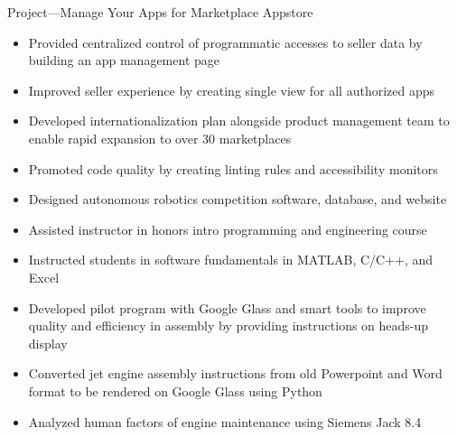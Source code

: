 \documentclass[11pt,letterpaper,ragged2e,withhyper]{altacv}
\newif\ifbubbles
\begin{document}
\begin{paracol}{2}
\divider

\par Project—Manage Your Apps for Marketplace Appstore
\begin{itemize}
    \item Provided centralized control of programmatic accesses to seller data by \linebreak building an app management page
    \item Improved seller experience by creating single view for all authorized apps
    \item Developed internationalization plan alongside product management team to enable rapid expansion to over 30 marketplaces
    \item Promoted code quality by creating linting rules and accessibility monitors
\end{itemize}

\ifbubbles
    \cvtag{TypeScript}
    \cvtag{Java}
    \cvtag{React}
    \cvtag{Redux}
    \cvtag{Jest}
    \cvtag{Enzyme}
    \cvtag{REST}
    \cvtag{i18next}
\fi

\divider

\begin{itemize}
    \item Designed autonomous robotics competition software, database, and website
    \item Assisted instructor in honors intro programming and engineering course
    \item Instructed students in software fundamentals in MATLAB, C/C++, and Excel
\end{itemize}

\ifbubbles
    \cvtag{Education}
    \cvtag{C}
    \cvtag{C++}
    \cvtag{MATLAB}
    \cvtag{Excel}
    \cvtag{C\#}
    \cvtag{ASP.NET}
    \cvtag{SQL}
\fi

\divider

\begin{itemize}
    \item Developed pilot program with Google Glass and smart tools to improve quality and efficiency in assembly by providing instructions on heads-up display
    \item Converted jet engine assembly instructions from old Powerpoint and Word format to be rendered on Google Glass using Python
    \item Analyzed human factors of engine maintenance using Siemens Jack 8.4
\end{itemize}


\end{paracol}
\end{document}
